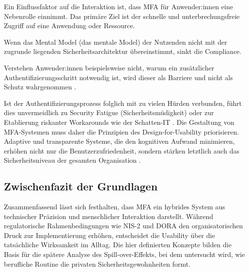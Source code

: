 Ein Einflussfaktor auf die Interaktion ist, dass MFA für Anwender:innen eine Nebenrolle einnimmt. Das primäre Ziel ist der schnelle und unterbrechungsfreie Zugriff auf eine Anwendung oder Ressource.

Wenn das {Mental Model} (das mentale Model) der Nutzenden nicht mit der zugrunde liegenden Sicherheitsarchitektur übereinstimmt, sinkt die Compliance.

Verstehen Anwender:innen beispielsweise nicht, warum ein zusätzlicher Authentifizierungsschritt notwendig ist, wird dieser als Barriere und nicht als Schutz wahrgenommen \cite[S. 160]{das2020}. 

Ist der Authentifizierungsprozess folglich mit zu vielen Hürden verbunden, führt dies unvermeidlich zu {Security Fatigue} (Sicherheitsmüdigkeit) oder zur Etablierung riskanter Workarounds wie der Schatten-IT \cite[S. 1141]{acemyan2018}. Die Gestaltung von MFA-Systemen muss daher die Prinzipien des {Design-for-Usability} priorisieren. Adaptive und transparente Systeme, die den kognitiven Aufwand minimieren, erhöhen nicht nur die Benutzerzufriedenheit, sondern stärken letztlich auch das Sicherheitsniveau der gesamten Organisation \cite[S. 201]{enhuber2023}.

\subsection{Zwischenfazit der Grundlagen}
Zusammenfassend lässt sich festhalten, dass MFA ein hybrides System aus technischer Präzision und menschlicher Interaktion darstellt. Während regulatorische Rahmenbedingungen wie NIS-2 und DORA den organisatorischen Druck zur Implementierung erhöhen, entscheidet die Usability über die tatsächliche Wirksamkeit im Alltag. Die hier definierten Konzepte bilden die Basis für die spätere Analyse des Spill-over-Effekts, bei dem untersucht wird, wie berufliche Routine die privaten Sicherheitsgewohnheiten formt.
